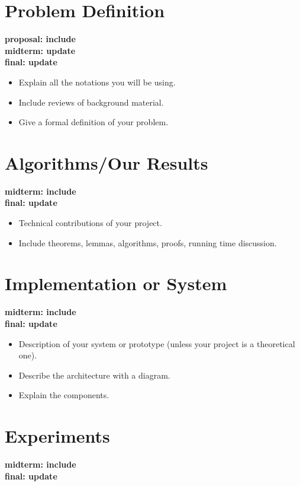 \documentclass[twocolumn]{article}
\newcommand{\red}[1]{{\bf \color{red}#1}}
\newcommand{\blue}[1]{{\bf \color{blue}#1}}
\begin{document}
\section{Problem Definition}
\blue{
proposal: include\\
midterm: update\\
final: update\\
}

\red{
\begin{itemize}
\itemsep0em
\item Explain all the notations you will be using.
\item Include reviews of background material.
\item Give a formal definition of your problem.
\end{itemize}
}


\section{Algorithms/Our Results}
\blue{
midterm: include\\
final: update\\
}

\red{
\begin{itemize}
\itemsep0em
\item Technical contributions of your project.
\item Include theorems, lemmas, algorithms, proofs, running time discussion.
\end{itemize}
}

\section{Implementation or System}
\blue{
midterm: include\\
final: update\\
}

\red{
\begin{itemize}
\itemsep0em
\item Description of your system or prototype (unless your project is a theoretical one).
\item Describe the architecture with a diagram.
\item Explain the components.
\end{itemize}
}


\section{Experiments}
\blue{
midterm: include\\
final: update\\
}
\end{document}

